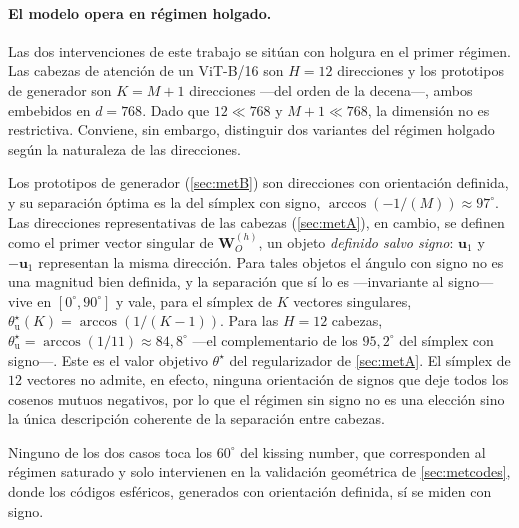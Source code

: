 \documentclass[11pt,a4paper]{article}
\theoremstyle{plain}
\begin{document}
\paragraph{El modelo opera en régimen holgado.} Las dos intervenciones
de este trabajo se sitúan con holgura en el primer régimen. Las cabezas
de atención de un ViT-B/16 son $H=12$ direcciones y los prototipos de
generador son $K=M+1$ direcciones ---del orden de la decena---, ambos
embebidos en $d=768$. Dado que $12\ll 768$ y $M+1\ll 768$, la dimensión
no es restrictiva. Conviene, sin embargo, distinguir dos variantes del
régimen holgado según la naturaleza de las direcciones.

Los prototipos de generador (\cref{sec:metB}) son direcciones con
orientación definida, y su separación óptima es la del símplex con
signo, $\arccos(-1/(M))\approx 97^\circ$. Las direcciones
representativas de las cabezas (\cref{sec:metA}), en cambio, se definen
como el primer vector singular de $\bm{W}_O^{(h)}$, un objeto
\emph{definido salvo signo}: $\bm{u}_1$ y $-\bm{u}_1$ representan la
misma dirección. Para tales objetos el ángulo con signo no es una
magnitud bien definida, y la separación que sí lo es ---invariante al
signo--- vive en $[0^\circ,90^\circ]$ y vale, para el símplex de $K$
vectores singulares, $\theta^\star_{\mathrm{u}}(K)=\arccos(1/(K-1))$.
Para las $H=12$ cabezas,
$\theta^\star_{\mathrm{u}}=\arccos(1/11)\approx 84{,}8^\circ$ ---el
complementario de los $95{,}2^\circ$ del símplex con signo---. Este es
el valor objetivo $\theta^\star$ del regularizador de \cref{sec:metA}.
El símplex de $12$ vectores no admite, en efecto, ninguna orientación
de signos que deje todos los cosenos mutuos negativos, por lo que el
régimen sin signo no es una elección sino la única descripción
coherente de la separación entre cabezas.

Ninguno de los dos casos toca los $60^\circ$ del kissing number, que
corresponden al régimen saturado y solo intervienen en la validación
geométrica de \cref{sec:metcodes}, donde los códigos esféricos,
generados con orientación definida, sí se miden con signo.
\end{document}

